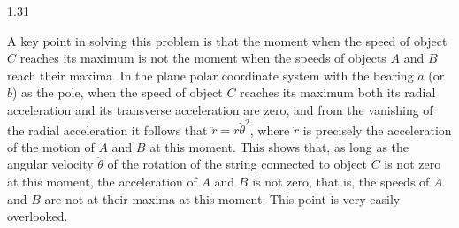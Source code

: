 \begin{solution}{1.31}
\begin{commentary}
A key point in solving this problem is that the moment when the speed of object $C$ reaches its maximum is not the moment when the speeds of objects $A$ and $B$ reach their maxima. In the plane polar coordinate system with the bearing $a$ (or $b$) as the pole, when the speed of object $C$ reaches its maximum both its radial acceleration and its transverse acceleration are zero, and from the vanishing of the radial acceleration it follows that $\ddot{r}=r\dot{\theta}^2$, where $\ddot{r}$ is precisely the acceleration of the motion of $A$ and $B$ at this moment. This shows that, as long as the angular velocity $\dot{\theta}$ of the rotation of the string connected to object $C$ is not zero at this moment, the acceleration of $A$ and $B$ is not zero, that is, the speeds of $A$ and $B$ are not at their maxima at this moment. This point is very easily overlooked.
\end{commentary}

\end{solution}

